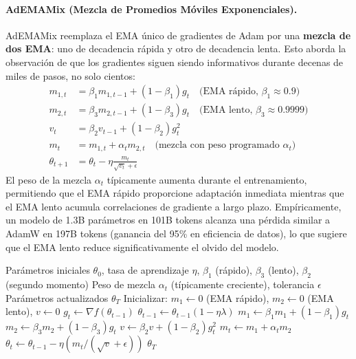 \paragraph{AdEMAMix (Mezcla de Promedios Móviles Exponenciales).}
AdEMAMix reemplaza el EMA único de gradientes de Adam por una \textbf{mezcla de dos EMA}: uno de decadencia rápida y otro de decadencia lenta. Esto aborda la observación de que los gradientes siguen siendo informativos durante decenas de miles de pasos, no solo cientos:
\begin{align}
m_{1,t} &= \beta_1 m_{1,t-1} + (1-\beta_1)g_t \quad\text{(EMA rápido, $\beta_1 \approx 0.9$)} \\
m_{2,t} &= \beta_3 m_{2,t-1} + (1-\beta_3)g_t \quad\text{(EMA lento, $\beta_3 \approx 0.9999$)} \\
v_t &= \beta_2 v_{t-1} + (1-\beta_2)g_t^2 \\
m_t &= m_{1,t} + \alpha_t m_{2,t} \quad\text{(mezcla con peso programado $\alpha_t$)} \\
\theta_{t+1} &= \theta_t - \eta\frac{m_t}{\sqrt{v_t}+\epsilon}
\end{align}
El peso de la mezcla $\alpha_t$ típicamente aumenta durante el entrenamiento, permitiendo que el EMA rápido proporcione adaptación inmediata mientras que el EMA lento acumula correlaciones de gradiente a largo plazo. Empíricamente, un modelo de 1.3B parámetros en 101B tokens alcanza una pérdida similar a AdamW en 197B tokens (ganancia del 95\% en eficiencia de datos), lo que sugiere que el EMA lento reduce significativamente el olvido del modelo.

\begin{algorithm}[H]
\caption{AdEMAMix (Mezcla de Promedios Móviles Exponenciales)}
\label{alg:ademamix}
\begin{algorithmic}[1]
\Require Parámetros iniciales $\theta_0$, tasa de aprendizaje $\eta$, $\beta_1$ (rápido), $\beta_3$ (lento), $\beta_2$ (segundo momento)
\Require Peso de mezcla $\alpha_t$ (típicamente creciente), tolerancia $\epsilon$
\Ensure Parámetros actualizados $\theta_T$
\State Inicializar: $m_1 \gets 0$ (EMA rápido), $m_2 \gets 0$ (EMA lento), $v \gets 0$
    \State $g_t \gets \nabla f(\theta_{t-1})$
        \State $\theta_{t-1} \gets \theta_{t-1}(1 - \eta\lambda)$
    \EndIf
    \State $m_1 \gets \beta_1 m_1 + (1-\beta_1) g_t$ 
    \State $m_2 \gets \beta_3 m_2 + (1-\beta_3) g_t$ 
    \State $v \gets \beta_2 v + (1-\beta_2) g_t^2$
    \State $m_t \gets m_1 + \alpha_t m_2$ 
    \State $\theta_t \gets \theta_{t-1} - \eta (m_t / (\sqrt{v} + \epsilon))$
\EndFor
\Return $\theta_T$
\end{algorithmic}
\end{algorithm}

